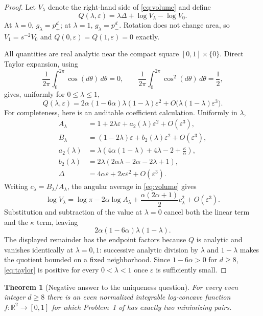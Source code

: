 \documentclass[11pt]{article}
\newtheorem{theorem}{Theorem}
\newcommand{\R}{\mathbb R}
\newcommand{\eps}{\varepsilon}
\begin{document}
\begin{proof}
Let $V_\lambda$ denote the right-hand side of \eqref{eq:volume} and define
\[
 Q(\lambda,\eps)=\lambda\Delta+\log V_\lambda-\log V_0.
\]
At $\lambda=0$, $g_\lambda=p_+^d$; at $\lambda=1$,
$g_\lambda=p_-^d$.  Rotation does not change area, so
$V_1=s^{-2}V_0$ and $Q(0,\eps)=Q(1,\eps)=0$ exactly.

All quantities are real analytic near the compact square
$[0,1]\times\{0\}$.  Direct Taylor expansion, using
\[
 \frac1{2\pi}\int_0^{2\pi}\cos(d\theta)\,d\theta=0,
 \qquad
 \frac1{2\pi}\int_0^{2\pi}\cos^2(d\theta)\,d\theta=\frac12,
\]
gives, uniformly for $0\leq\lambda\leq1$,
\begin{equation}\label{eq:taylor}
 Q(\lambda,\eps)
 =2\alpha(1-6\alpha)\lambda(1-\lambda)\eps^2
   +O\bigl(\lambda(1-\lambda)\eps^3\bigr).
\end{equation}
For completeness, here is an auditable coefficient calculation.  Uniformly
in $\lambda$,
\begin{align*}
 A_\lambda&=1+2\lambda\eps+a_2(\lambda)\eps^2+O(\eps^3),\\
 B_\lambda&=(1-2\lambda)\eps+b_2(\lambda)\eps^2+O(\eps^3),\\
 a_2(\lambda)&=\lambda\left(4\alpha(1-\lambda)+4\lambda-2
                    +\frac{\kappa}{\alpha}\right),\\
 b_2(\lambda)&=2\lambda(2\alpha\lambda-2\alpha-2\lambda+1),\\
 \Delta&=4\alpha\eps+2\kappa\eps^2+O(\eps^3).
\end{align*}
Writing $c_\lambda=B_\lambda/A_\lambda$, the angular average in
\eqref{eq:volume} gives
\[
 \log V_\lambda
 =\log\pi-2\alpha\log A_\lambda
  +\frac{\alpha(2\alpha+1)}2c_\lambda^2+O(\eps^3).
\]
Substitution and subtraction of the value at $\lambda=0$ cancel both the
linear term and the $\kappa$ term, leaving
\[
 2\alpha(1-6\alpha)\lambda(1-\lambda).
\]
The displayed remainder has the endpoint factors because $Q$ is analytic and
vanishes identically at $\lambda=0,1$: successive analytic division by
$\lambda$ and $1-\lambda$ makes the quotient bounded on a fixed
neighborhood.  Since $1-6\alpha>0$ for $d\geq8$, \eqref{eq:taylor} is
positive for every $0<\lambda<1$ once $\eps$ is sufficiently small.
\end{proof}

\begin{theorem}[Negative answer to the uniqueness question]\label{thm:main}
For every even integer $d\geq8$ there is an even normalized integrable
log-concave function $f:\R^2\to[0,1]$ for which Problem~1 of \cite{AGMV}
has exactly two minimizing pairs.
\end{theorem}
\end{document}
